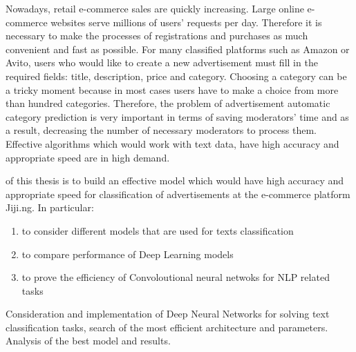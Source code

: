 {\actuality} Nowadays, retail e-commerce sales are quickly increasing. Large online e-commerce websites serve millions of users’ requests per day. Therefore it is necessary to make the processes of registrations and purchases as much convenient and fast as possible. For many classified platforms such as Amazon or Avito, users who would like to create a new advertisement must fill in the required fields: title, description, price and category. Choosing a category can be a tricky moment because in most cases users have to make a choice from more than hundred categories. Therefore, the problem  of advertisement automatic category prediction is very important in terms of saving moderators' time and as a result, decreasing the number of necessary moderators to process them. Effective algorithms which would work with text data, have high accuracy and appropriate speed are in high demand.

{\aim} of this thesis is to build an effective model which would have high accuracy and appropriate speed for classification of advertisements at the e-commerce platform Jiji.ng. 
In particular:
\begin{enumerate}
	\item to consider different models that are used for texts classification 
	\item to compare performance of Deep Learning models 
	\item to prove the efficiency of Convoloutional neural netwoks for NLP related tasks 
\end{enumerate}


{\novelty}
Consideration and implementation of Deep Neural Networks for solving text classification tasks, search of the most efficient architecture and parameters. Analysis of the best model and results.

%
%
%
%
%
%
